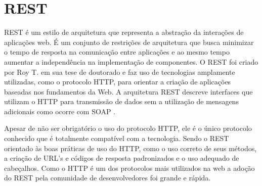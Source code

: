 \documentclass[
	12pt,				%
	openright,			%
	oneside,			%
	a4paper,			%
	english,			%
	french,				%
	spanish,			%
	brazil				%
	]{abntex2}
\begin{document}
%

\section{REST}


REST é um estilo de arquitetura que representa a abstração da interações de aplicações web. É um conjunto de restrições de arquitetura que busca minimizar o tempo de resposta na comunicação entre aplicações e ao mesmo tempo aumentar a independência na implementação de componentes. O REST foi criado por Roy T.  em sua tese de doutorado e faz uso de tecnologias amplamente utilizadas, como o protocolo HTTP, para orientar a criação de aplicações baseadas nos fundamentos da Web. A arquitetura REST descreve interfaces que utilizam o HTTP para transmissão de dados sem a utilização de mensagens adicionais como ocorre com SOAP \cite{dal2009web}.

Apesar de não ser obrigatório o uso do protocolo HTTP, ele é o único protocolo conhecido que é  totalmente compatível com a tecnologia. Sendo o REST orientado às boas práticas de uso do HTTP, como o  uso correto de seus métodos, a criação de URL’s e códigos de resposta padronizados e o uso adequado de cabeçalhos.  Como o HTTP é um dos protocolos mais utilizados na web a adoção do REST pela comunidade de desenvolvedores foi grande e rápida.	
\end{document}

